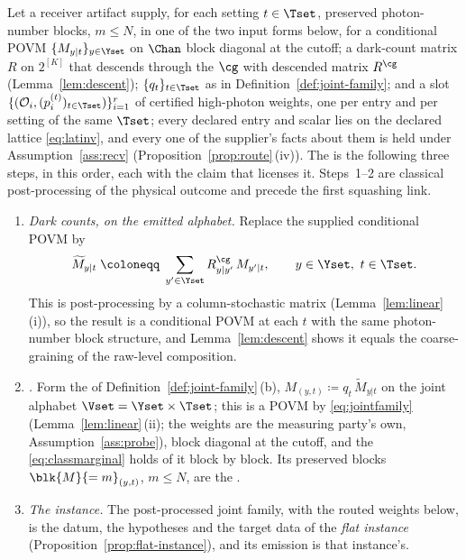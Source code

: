 \begin{definition}\label{def:weight-route}
Let a receiver artifact supply, for each setting $t\in\Tset$, preserved
photon-number blocks, $m\le N$, in one of the two input forms below, for a
conditional POVM $\{M_{y|t}\}_{y\in\Yset}$ on $\Chan$ block diagonal at the
cutoff; a
dark-count matrix $R$ on $2^{[K]}$ that descends through the
 $\cg$ with descended matrix $R^{\cg}$
(Lemma~\ref{lem:descent});  $\{q_t\}_{t\in\Tset}$ as in
Definition~\ref{def:joint-family}; and a slot
$\{(\mathcal{O}_i,(p^{(t)}_i)_{t\in\Tset})\}_{i=1}^{r}$ of certified
high-photon weights, one per entry and per setting of the same $\Tset$;
every declared entry and scalar lies on the declared lattice
\eqref{eq:latinv}, and every one of the supplier's facts about them is held
under Assumption~\ref{ass:recv} (Proposition~\ref{prop:route}\,(iv)). The
is the following three steps, in this order, each with the claim that
licenses it. Steps~1--2 are classical post-processing of the physical outcome
and precede the first squashing link.
\begin{enumerate}[leftmargin=2.2em]
\item \emph{Dark counts, on the emitted alphabet.} Replace the supplied
  conditional POVM by
  \begin{equation}\label{eq:darkstep}
    \widetilde M_{y|t}\;\coloneqq\;\sum_{y'\in\Yset}R^{\cg}_{y|y'}\,M_{y'|t},
    \qquad y\in\Yset,\ t\in\Tset .
  \end{equation}
  This is post-processing by a column-stochastic matrix
  (Lemma~\ref{lem:linear}\,(i)), so the result is a conditional POVM at each
  $t$ with the same photon-number block structure, and
  Lemma~\ref{lem:descent} shows it equals the coarse-graining of the raw-level
  composition.
\item \emph{.} Form the
   of Definition~\ref{def:joint-family}\,(b),
  $M_{(y,t)}\coloneqq q_t\,\widetilde M_{y|t}$ on the joint alphabet
  $\Vset=\Yset\times\Tset$;
  this is a POVM by \eqref{eq:jointfamily} (Lemma~\ref{lem:linear}\,(ii);
  the weights are the measuring party's own, Assumption~\ref{ass:probe}), block diagonal at
  the cutoff, and the  \eqref{eq:classmarginal}
  holds of it block by block. Its preserved blocks $\blk{M}{=m}_{(y,t)}$,
  $m\le N$, are the
  .
\item \emph{The instance.} The post-processed joint family, with the routed
  weights below, is the datum, the hypotheses and the target data of the
  \emph{flat instance} (Proposition~\ref{prop:flat-instance}), and its
  emission is that instance's.
\end{enumerate}


\end{definition}
